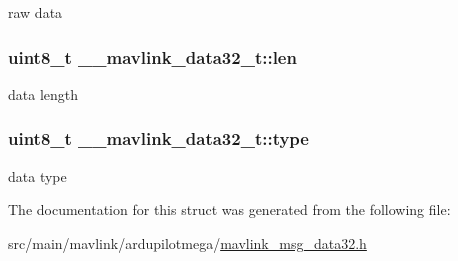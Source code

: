 raw data 

\hypertarget{struct____mavlink__data32__t_a04a974c0976a09a529290eb85be7f415}{
\subsubsection[{len}]{\setlength{\rightskip}{0pt plus 5cm}uint8\+\_\+t \+\_\+\+\_\+mavlink\+\_\+data32\+\_\+t\+::len}}\label{struct____mavlink__data32__t_a04a974c0976a09a529290eb85be7f415}


data length 

\hypertarget{struct____mavlink__data32__t_a9374e2028b27751e3f49239c83d9be27}{
\subsubsection[{type}]{\setlength{\rightskip}{0pt plus 5cm}uint8\+\_\+t \+\_\+\+\_\+mavlink\+\_\+data32\+\_\+t\+::type}}\label{struct____mavlink__data32__t_a9374e2028b27751e3f49239c83d9be27}


data type 



The documentation for this struct was generated from the following file\+:\begin{DoxyCompactItemize}
\item 
src/main/mavlink/ardupilotmega/\hyperlink{mavlink__msg__data32_8h}{mavlink\+\_\+msg\+\_\+data32.\+h}\end{DoxyCompactItemize}
